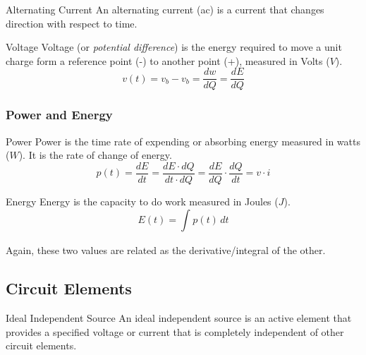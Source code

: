 \documentclass[12pt]{article}
\begin{document}
\begin{definition}{Alternating Current}
  An alternating current (ac) is a current that changes direction with respect to time.
\end{definition}

\begin{definition}{Voltage}
  Voltage (or \textit{potential difference}) is the energy required to move a unit charge form a reference point (-) to another point (+), measured in Volts ($V$).
  \begin{equation*}
    v(t) = v_b - v_b = \frac{dw}{dQ} = \frac{dE}{dQ}
  \end{equation*}
\end{definition}

%   

\subsubsection{Power and Energy}
\label{sssec:powerAndEnergy}

\begin{definition}{Power}
  Power is the time rate of expending or absorbing energy measured in watts ($W$). It is the rate of change of energy.
  \begin{equation*}
    p(t) = \frac{dE}{dt} = \frac{dE \cdot dQ}{dt \cdot dQ} = \frac{dE}{dQ} \cdot \frac{dQ}{dt} = v \cdot i
  \end{equation*}
\end{definition}

\begin{definition}{Energy}
  Energy is the capacity to do work measured in Joules ($J$).
  \begin{equation*}
    E(t) = \int_{}^{} p(t) \, dt
  \end{equation*}
\end{definition}

Again, these two values are related as the derivative/integral of the other.

\subsection{Circuit Elements}
\label{ssec:circuitElements}

\begin{definition}{Ideal Independent Source}
  An ideal independent source is an active element that provides a specified voltage or current that is completely independent of other circuit elements.
\end{definition}
\end{document}

